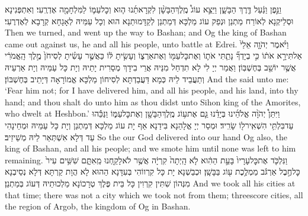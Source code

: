 \newperek
{}%
{וַנֵּ֣פֶן וַנַּ֔עַל דֶּ֖רֶךְ הַבָּשָׁ֑ן וַיֵּצֵ֣א עוֹג֩ מֶֽלֶךְ\maqqaf הַבָּשָׁ֨ן לִקְרָאתֵ֜נוּ ה֧וּא וְכׇל\maqqaf עַמּ֛וֹ לַמִּלְחָמָ֖ה אֶדְרֶֽעִי׃}
{וְאִתְפְּנִינָא וּסְלֵיקְנָא לְאוֹרַח מַתְנַן וּנְפַק עוֹג מַלְכָּא דְּמַתְנַן לְקַדָּמוּתַנָא הוּא וְכָל עַמֵּיהּ לְאָגָחָא קְרָבָא לְאֶדְרֶעִי׃}
{Then we turned, and went up the way to Bashan; and Og the king of Bashan came out against us, he and all his people, unto battle at Edrei.}{}
{וַיֹּ֨אמֶר יְהֹוָ֤ה אֵלַי֙ אַל\maqqaf תִּירָ֣א אֹת֔וֹ כִּ֣י בְיָדְךָ֞ נָתַ֧תִּי אֹת֛וֹ וְאֶת\maqqaf כׇּל\maqqaf עַמּ֖וֹ וְאֶת\maqqaf אַרְצ֑וֹ וְעָשִׂ֣יתָ לּ֔וֹ כַּאֲשֶׁ֣ר עָשִׂ֗יתָ לְסִיחֹן֙ מֶ֣לֶךְ הָֽאֱמֹרִ֔י אֲשֶׁ֥ר יוֹשֵׁ֖ב בְּחֶשְׁבּֽוֹן׃}
{וַאֲמַר יְיָ לִי לָא תִדְחַל מִנֵּיהּ אֲרֵי בִידָךְ מְסַרִית יָתֵיהּ וְיָת כָּל עַמֵּיהּ וְיָת אַרְעֵיהּ וְתַעֲבֵיד לֵיהּ כְּמָא דַּעֲבַדְתָּא לְסִיחוֹן מַלְכָּא אֱמוֹרָאָה דְּיָתֵיב בְּחֶשְׁבּוֹן׃}
{And the \lord\space said unto me: ‘Fear him not; for I have delivered him, and all his people, and his land, into thy hand; and thou shalt do unto him as thou didst unto Sihon king of the Amorites, who dwelt at Heshbon.’}{}
{וַיִּתֵּן֩ יְהֹוָ֨ה אֱלֹהֵ֜ינוּ בְּיָדֵ֗נוּ גַּ֛ם אֶת\maqqaf ע֥וֹג מֶֽלֶךְ\maqqaf הַבָּשָׁ֖ן וְאֶת\maqqaf כׇּל\maqqaf עַמּ֑וֹ וַנַּכֵּ֕הוּ עַד\maqqaf בִּלְתִּ֥י הִשְׁאִֽיר\maqqaf ל֖וֹ שָׂרִֽיד׃}
{וּמְסַר יְיָ אֱלָהַנָא בִּידַנָא אַף יָת עוֹג מַלְכָּא דְּמַתְנַן וְיָת כָּל עַמֵּיהּ וּמְחֵינָהִי עַד דְּלָא אִשְׁתְּאַר לֵיהּ מְשֵׁיזֵיב׃}
{So the \lord\space our God delivered into our hand Og also, the king of Bashan, and all his people; and we smote him until none was left to him remaining.}{}
{וַנִּלְכֹּ֤ד אֶת\maqqaf כׇּל\maqqaf עָרָיו֙ בָּעֵ֣ת הַהִ֔וא לֹ֤א הָֽיְתָה֙ קִרְיָ֔ה אֲשֶׁ֥ר לֹא\maqqaf לָקַ֖חְנוּ מֵֽאִתָּ֑ם שִׁשִּׁ֥ים עִיר֙ כׇּל\maqqaf חֶ֣בֶל אַרְגֹּ֔ב מַמְלֶ֥כֶת ע֖וֹג בַּבָּשָֽׁן׃}
{וּכְבַשְׁנָא יָת כָּל קִרְווֹהִי בְּעִדָּנָא הַהוּא לָא הֲוָת קַרְתָּא דְּלָא נְסֵיבְנָא מִנְּהוֹן שִׁתִּין קִרְוִין כָּל בֵּית פֶּלֶךְ טְרָכוֹנָא מַלְכוּתֵיהּ דְּעוֹג בְּמַתְנַן׃}
{And we took all his cities at that time; there was not a city which we took not from them; threescore cities, all the region of Argob, the kingdom of Og in Bashan.}{}
